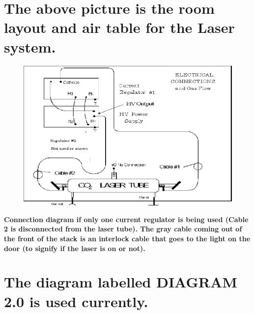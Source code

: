 \documentclass{../lab}
\begin{document}
\section{The above picture is the room layout and air table for the Laser system.}


\begin{figure}[h]
    \centering
    \href{http://experimentationlab.berkeley.edu/sites/default/files/images/Co2-29-new.png}{\includegraphics[width=\linewidth]{images/Co2-29-new.png}}
    \caption{}
    \label{fig:Co2-29-new}
\end{figure}

\textbf{Connection diagram if only one current regulator is being used (Cable 2 is disconnected from the laser tube). The gray cable coming out of the front of the stack is an interlock cable that goes to the light on the door (to signify if the laser is on or not).}

\section{The diagram labelled DIAGRAM 2.0 is used currently.}
\end{document}
